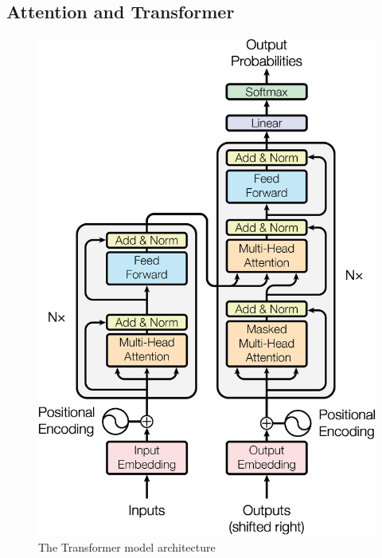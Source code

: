 \subsection{Attention and Transformer}
\citet{bahdanau2016neural}

\begin{minipage}[ht]{.6\textwidth}
    \begin{figure}[H]
        \centering
        \includegraphics[width=\textwidth]{literature/imgs/ext-transformer.png}
        \caption{The Transformer model architecture \cite{vaswani2017attention}}
        \label{fig:ext-transformer}
    \end{figure}
\end{minipage}

